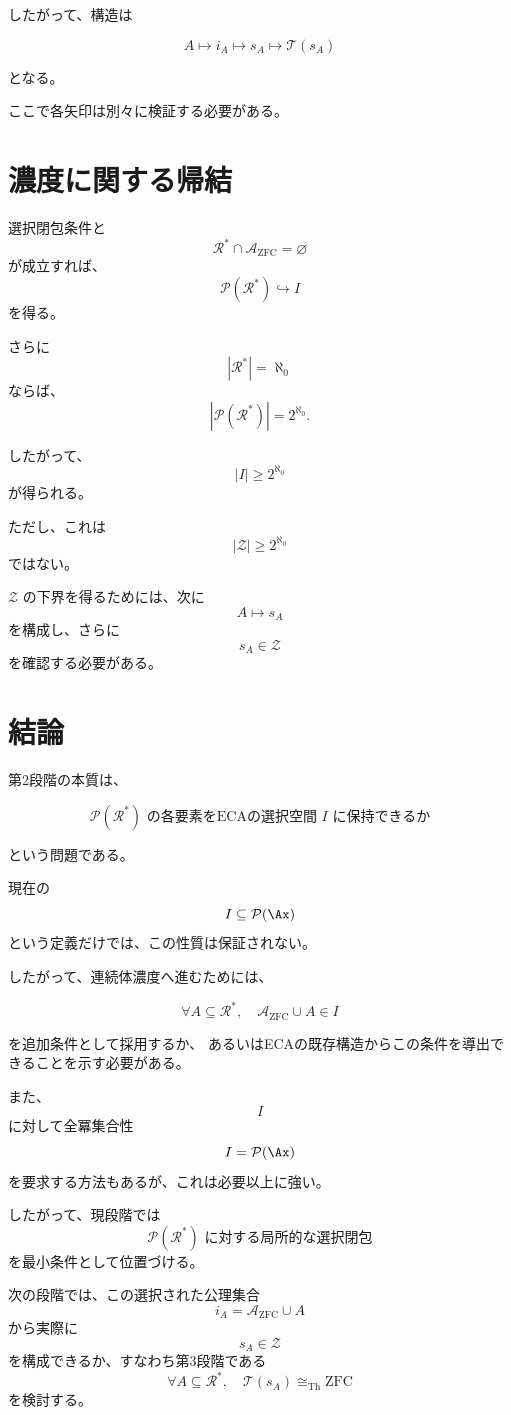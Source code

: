 \documentclass[11pt,a4paper]{article}
\begin{document}
したがって、構造は

\[
A
\longmapsto
i_A
\longmapsto
s_A
\longmapsto
\mathcal T(s_A)
\]

となる。

ここで各矢印は別々に検証する必要がある。

\section{濃度に関する帰結}

選択閉包条件と
\[
\mathcal R^*\cap\mathcal A_{\mathrm{ZFC}}=\varnothing
\]
が成立すれば、
\[
\mathcal P(\mathcal R^*)\hookrightarrow I
\]
を得る。

さらに
\[
|\mathcal R^*|=\aleph_0
\]
ならば、
\[
|\mathcal P(\mathcal R^*)|
=
2^{\aleph_0}.
\]

したがって、
\[
\boxed{
|I|\geq2^{\aleph_0}
}
\]
が得られる。

ただし、これは
\[
|\mathcal Z|\geq2^{\aleph_0}
\]
ではない。

$\mathcal Z$ の下界を得るためには、次に
\[
A\longmapsto s_A
\]
を構成し、さらに
\[
s_A\in\mathcal Z
\]
を確認する必要がある。

\section{結論}

第2段階の本質は、

\[
\boxed{
\mathcal P(\mathcal R^*)
\text{ の各要素をECAの選択空間 }I\text{ に保持できるか}
}
\]

という問題である。

現在の
\[
I\subseteq\mathcal P(\Ax)
\]
という定義だけでは、この性質は保証されない。

したがって、連続体濃度へ進むためには、

\[
\boxed{
\forall A\subseteq\mathcal R^*,
\quad
\mathcal A_{\mathrm{ZFC}}\cup A\in I
}
\]

を追加条件として採用するか、
あるいはECAの既存構造からこの条件を導出できることを示す必要がある。

また、
\[
I
\]
に対して全冪集合性
\[
I=\mathcal P(\Ax)
\]
を要求する方法もあるが、これは必要以上に強い。

したがって、現段階では
\[
\mathcal P(\mathcal R^*)\text{ に対する局所的な選択閉包}
\]
を最小条件として位置づける。

次の段階では、この選択された公理集合
\[
i_A=\mathcal A_{\mathrm{ZFC}}\cup A
\]
から実際に
\[
s_A\in\mathcal Z
\]
を構成できるか、すなわち第3段階である
\[
\boxed{
\forall A\subseteq\mathcal R^*,
\quad
\mathcal T(s_A)\cong_{\mathrm{Th}}\mathrm{ZFC}
}
\]
を検討する。
\end{document}
